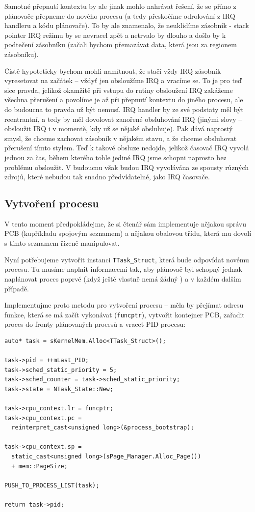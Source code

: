 \documentclass{article}
\begin{document}
Samotné přepnutí kontextu by ale jinak mohlo nahrávat řešení, že se přímo z plánovače přepneme do nového procesu (a tedy přeskočíme odrolování z IRQ handleru a kódu plánovače). To by ale znamenalo, že neuklidíme zásobník - stack pointer IRQ režimu by se nevracel zpět a netrvalo by dlouho a došlo by k podtečení zásobníku (začali bychom přemazávat data, která jsou za regionem zásobníku).

Čistě hypoteticky bychom mohli namítnout, že stačí vždy IRQ zásobník vyresetovat na začátek -- vždyť jen obsloužíme IRQ a vracíme se. To je pro teď sice pravda, jelikož okamžitě při vstupu do rutiny obsloužení IRQ zakážeme všechna přerušení a povolíme je až při přepnutí kontextu do jiného procesu, ale do budoucna to pravda už být nemusí. IRQ handler by ze své podstaty měl být reentrantní, a tedy by měl dovolovat zanořené obsluhování IRQ (jinými slovy -- obsloužit IRQ i v momentě, kdy už se nějaké obsluhuje). Pak dává naprostý smysl, že chceme zachovat zásobník v nějakém stavu, a že chceme obsluhovat přerušení tímto stylem. Teď k takové obsluze nedojde, jelikož časovač IRQ vyvolá jednou za čas, během kterého tohle jediné IRQ jsme schopni naprosto bez problému obsloužit. V budoucnu však budou IRQ vyvolávána ze spousty různých zdrojů, které nebudou tak snadno předvídatelné, jako IRQ časovače.

\subsection{Vytvoření procesu}

V tento moment předpokládejme, že si čtenář sám implementuje nějakou správu PCB (kupříkladu spojovým seznamem) a nějakou obalovou třídu, která mu dovolí s tímto seznamem řízeně manipulovat.

Nyní potřebujeme vytvořit instanci \texttt{TTask\_Struct}, která bude odpovídat novému procesu. Tu musíme naplnit informacemi tak, aby plánovač byl schopný jednak naplánovat proces poprvé (když ještě vlastně nemá žádný ) a v každém dalším případě.

Implementujme proto metodu pro vytvoření procesu -- měla by přejímat adresu funkce, která se má začít vykonávat (\texttt{funcptr}), vytvořit kontejner PCB, zařadit proces do fronty plánovaných procesů a vracet PID procesu:

\begin{lstlisting}
auto* task = sKernelMem.Alloc<TTask_Struct>();

task->pid = ++mLast_PID;
task->sched_static_priority = 5;
task->sched_counter = task->sched_static_priority;
task->state = NTask_State::New;

task->cpu_context.lr = funcptr;
task->cpu_context.pc =
  reinterpret_cast<unsigned long>(&process_bootstrap);

task->cpu_context.sp =
  static_cast<unsigned long>(sPage_Manager.Alloc_Page())
  + mem::PageSize;
  
PUSH_TO_PROCESS_LIST(task);

return task->pid;
\end{lstlisting}
\end{document}

